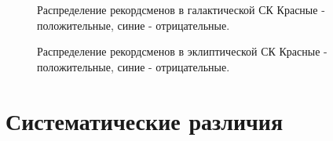 \documentclass[14pt,aspectratio=43]{beamer}
\begin{document}
\begin{frame}[<alignment>]
\begin{figure}[h!]
\caption{Распределение рекордсменов в галактической СК Красные - положительные, синие - отрицательные.}
\label{img:75maxlb}
\end{figure}
\end{frame}

\begin{frame}[<alignment>]
\begin{figure}[h!]
\caption{Распределение рекордсменов в эклиптической СК Красные - положительные, синие - отрицательные.}
\label{img:75maxlonlat}
\end{figure}
\end{frame}	


\section{Систематические различия}\label{sistem}
\end{document}
